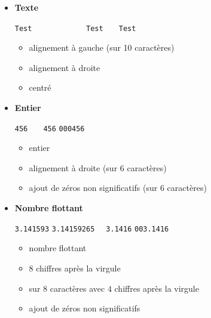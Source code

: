 \documentclass[11pt,class=report,crop=false]{standalone}
\begin{document}
\begin{itemize}
  \item \textbf{Texte}
  
  \begin{center}
 \lstinline[showspaces=true]!Test      ! \qquad\qquad
    \lstinline[showspaces=true]!      Test!  \qquad\qquad
 \lstinline[showspaces=true]!   Test   !   
 \end{center}
 
  \begin{itemize}
    \item {} \quad alignement à gauche (sur 10 caractères)
    \item {} \quad alignement à droite
    \item {} \quad centré 
  \end{itemize}

  \item \textbf{Entier}
  
  \begin{center}
 \lstinline[showspaces=true]!456! \qquad\qquad
    \lstinline[showspaces=true]!   456!  \qquad\qquad
 \lstinline[showspaces=true]!000456!   
 \end{center}
 
  \begin{itemize}
    \item {} \quad entier  
    \item {} \quad alignement à droite (sur 6 caractères)
    \item {} \quad ajout de zéros non significatifs  (sur 6 caractères)
  \end{itemize} 
  
  \item \textbf{Nombre flottant}
  
  \begin{center}
 \lstinline[showspaces=true]!3.141593! \qquad\qquad
    \lstinline[showspaces=true]!3.14159265!  \qquad\qquad
 \lstinline[showspaces=true]!  3.1416!  \qquad\qquad
 \lstinline[showspaces=true]!003.1416!   
 \end{center}
 
  \begin{itemize}
    \item {} \quad nombre flottant 
    \item {} \quad $8$ chiffres après la virgule 
    \item {} \quad sur $8$ caractères avec $4$ chiffres après la virgule 
    \item 
     \quad ajout de zéros non significatifs 
  \end{itemize}   
   
\end{itemize}
\end{document}
